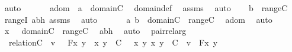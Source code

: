 \begin{isabellebody}
\ auto\ \isanewline
\ \ \isamarkupfalse%
\ \isamarkupfalse%
\ adom\ {\isacharcolon}{\kern0pt}\ {\isachardoublequoteopen}a\ {\isasymin}\ domain{\isacharparenleft}{\kern0pt}C{\isacharparenright}{\kern0pt}{\isachardoublequoteclose}\ \isamarkupfalse%
\ domain{\isacharunderscore}{\kern0pt}def\ \isamarkupfalse%
\ assms\ \isamarkupfalse%
\ auto\isanewline
\ \ \isamarkupfalse%
\ {\isachardoublequoteopen}b\ {\isasymin}\ range{\isacharparenleft}{\kern0pt}C{\isacharparenright}{\kern0pt}{\isachardoublequoteclose}\ \isamarkupfalse%
\ rangeI\ abh\ assms\ \isamarkupfalse%
\ auto\ \isanewline
\ \ \isamarkupfalse%
\ \isamarkupfalse%
\ {\isachardoublequoteopen}{\isacharless}{\kern0pt}a{\isacharcomma}{\kern0pt}\ b{\isachargreater}{\kern0pt}\ {\isasymin}\ domain{\isacharparenleft}{\kern0pt}C{\isacharparenright}{\kern0pt}\ {\isasymtimes}\ range{\isacharparenleft}{\kern0pt}C{\isacharparenright}{\kern0pt}{\isachardoublequoteclose}\ \isamarkupfalse%
\ adom\ \isamarkupfalse%
\ auto\ \isanewline
\ \ \isamarkupfalse%
\ \isamarkupfalse%
\ {\isachardoublequoteopen}x\ {\isasymin}\ \ domain{\isacharparenleft}{\kern0pt}C{\isacharparenright}{\kern0pt}\ {\isasymtimes}\ range{\isacharparenleft}{\kern0pt}C{\isacharparenright}{\kern0pt}{\isachardoublequoteclose}\ \isamarkupfalse%
\ abh\ \isamarkupfalse%
\ auto\ \isanewline
{}\isamarkupfalse%
%
\endisatagproof
{\isafoldproof}%
%
\isadelimproof
\isanewline
%
\endisadelimproof
\isanewline
{}\isamarkupfalse%
\ pair{\isacharunderscore}{\kern0pt}rel{\isacharunderscore}{\kern0pt}arg\ {\isacharcolon}{\kern0pt}\ \isanewline
\ \ {\isachardoublequoteopen}relation{\isacharparenleft}{\kern0pt}C{\isacharparenright}{\kern0pt}\ {\isasymLongrightarrow}\ v\ {\isasymin}\ {\isacharbraceleft}{\kern0pt}\ F{\isacharparenleft}{\kern0pt}x{\isacharcomma}{\kern0pt}\ y{\isacharparenright}{\kern0pt}\ {\isachardot}{\kern0pt}\ {\isacharless}{\kern0pt}x{\isacharcomma}{\kern0pt}\ y{\isachargreater}{\kern0pt}\ {\isasymin}\ C\ {\isacharbraceright}{\kern0pt}\ {\isasymLongrightarrow}\ {\isasymexists}x{\isachardot}{\kern0pt}\ {\isasymexists}y{\isachardot}{\kern0pt}\ {\isacharless}{\kern0pt}x{\isacharcomma}{\kern0pt}\ y{\isachargreater}{\kern0pt}\ {\isasymin}\ C\ {\isasymand}\ v\ {\isacharequal}{\kern0pt}\ F{\isacharparenleft}{\kern0pt}x{\isacharcomma}{\kern0pt}\ y{\isacharparenright}{\kern0pt}{\isachardoublequoteclose}\isanewline

\end{isabellebody}
